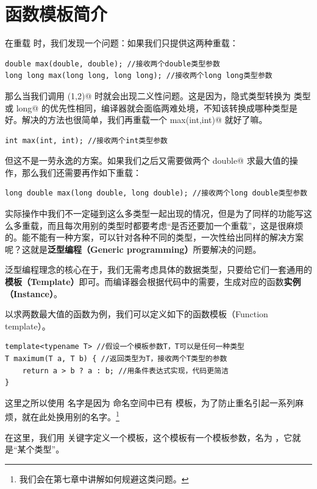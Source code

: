 \section{函数模板简介}
在重载 \lstinline@max@ 时，我们发现一个问题：如果我们只提供这两种重载：
\begin{lstlisting}
double max(double, double); //接收两个double类型参数
long long max(long long, long long); //接收两个long long类型参数
\end{lstlisting}
那么当我们调用 \lstinline@max(1,2)@ 时就会出现二义性问题。这是因为，\lstinline@int@ 隐式类型转换为 \lstinline@double@ 类型或 \lstinline@long long@ 的优先性相同，编译器就会面临两难处境，不知该转换成哪种类型是好。解决的方法也很简单，我们再重载一个 \lstinline@int max(int,int)@ 就好了嘛。
\begin{lstlisting}
int max(int, int); //接收两个int类型参数
\end{lstlisting}\par
但这不是一劳永逸的方案。如果我们之后又需要做两个 \lstinline@long double@ 求最大值的操作，那么我们还需要再作如下重载：
\begin{lstlisting}
long double max(long double, long double); //接收两个long double类型参数
\end{lstlisting}\par
实际操作中我们不一定碰到这么多类型一起出现的情况，但是为了同样的功能写这么多重载，而且每次用别的类型时都要考虑``是否还要加一个重载''，这是很麻烦的。能不能有一种方案，可以针对各种不同的类型，一次性给出同样的解决方案呢？这就是\textbf{泛型编程（Generic programming）}所要解决的问题。\par
泛型编程理念的核心在于，我们无需考虑具体的数据类型，只要给它们一套通用的\textbf{模板（Template）}即可。而编译器会根据代码中的需要，生成对应的函数\textbf{实例（Instance）}。\par\pagebreak
以求两数最大值的函数为例，我们可以定义如下的函数模板（Function template）。
\begin{lstlisting}
template<typename T> //假设一个模板参数T，T可以是任何一种类型
T maximum(T a, T b) { //返回类型为T，接收两个T类型的参数
    return a > b ? a : b; //用条件表达式实现，代码更简洁
}
\end{lstlisting}
这里之所以使用 \lstinline@maxinum@ 名字是因为 \lstinline@std@ 命名空间中已有 \lstinline@max@ 模板，为了防止重名引起一系列麻烦，就在此处换用别的名字。\footnote{我们会在第七章中讲解如何规避这类问题。}\par
在这里，我们用 \lstinline@template@ 关键字定义一个模板，这个模板有一个模板参数，名为 \lstinline@T@，它就是``某个类型''。\par
